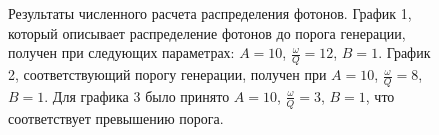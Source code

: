 \begin{figure}
\centering

\caption{Результаты численного расчета распределения фотонов. График
  1, который описывает распределение фотонов до порога генерации,
  получен при следующих параметрах: $A = 10$, $\frac{\omega}{Q} = 12$,
  $B = 1$. График 2, соответствующий порогу генерации, получен при $A = 10$, $\frac{\omega}{Q} = 8$,
  $B = 1$. Для графика 3 было принято $A = 10$, $\frac{\omega}{Q} = 3$,
  $B = 1$, что соответствует превышению порога.}
\label{figPart2Ch1_4}
\end{figure}
